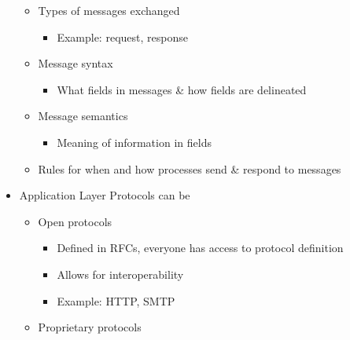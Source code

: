 \begin{itemize}
\begin{itemize}
      \item Types of messages exchanged

        \begin{itemize}

          \item Example: request, response

        \end{itemize}

      \item Message syntax

        \begin{itemize}

          \item What fields in messages \& how fields are delineated

        \end{itemize}

      \item Message semantics

        \begin{itemize}

          \item Meaning of information in fields

        \end{itemize}

      \item Rules for when and how processes send \& respond to messages

    \end{itemize}

  \item Application Layer Protocols can be

    \begin{itemize}

      \item Open protocols

        \begin{itemize}

          \item Defined in RFCs, everyone has access to protocol definition

          \item Allows for interoperability

          \item Example: HTTP, SMTP

        \end{itemize}

      \item Proprietary protocols


\end{itemize}
\end{itemize}
